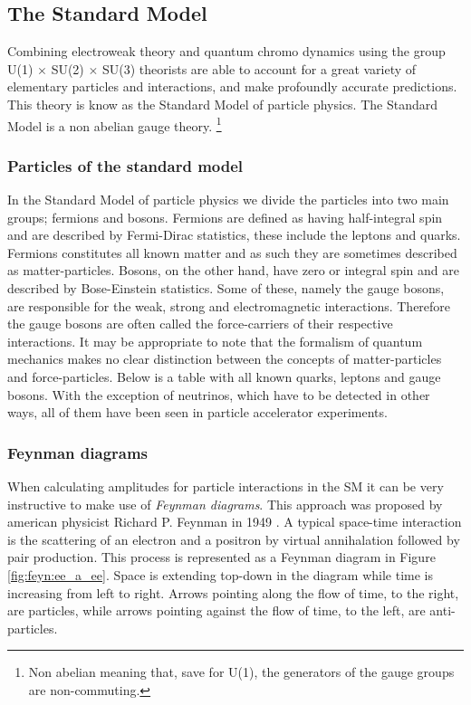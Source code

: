\subsection{The Standard Model}
Combining electroweak theory and quantum chromo dynamics using the group U(1) $\times$ SU(2) $\times$ SU(3) theorists are able to account for a great variety of elementary particles and interactions, and make profoundly accurate predictions. This theory is know as the Standard Model of particle physics. The Standard Model is a non abelian gauge theory. \footnote{Non abelian meaning that, save for U(1), the generators of the gauge groups are non-commuting.}

\subsubsection{Particles of the standard model}


In the Standard Model of particle physics we divide the particles into two main groups; fermions and bosons. Fermions are defined as having half-integral spin and are described by Fermi-Dirac statistics, these include the leptons and quarks. Fermions constitutes all known matter and as such they are sometimes described as matter-particles. Bosons, on the other hand, have zero or integral spin and are described by Bose-Einstein statistics. Some of these, namely the gauge bosons, are responsible for the weak, strong and electromagnetic interactions. Therefore the gauge bosons are often called the force-carriers of their respective interactions. It may be appropriate to note that the formalism of quantum mechanics makes no clear distinction between the concepts of matter-particles and force-particles. Below is a table with all known quarks, leptons and gauge bosons. With the exception of neutrinos, which have to be detected in other ways, all of them have been seen in particle accelerator experiments.

\subsubsection{Feynman diagrams}
When calculating amplitudes for particle interactions in the SM it can be very instructive to make use of \emph{Feynman diagrams}. This approach was proposed by american physicist Richard P. Feynman in 1949 \cite{feynman1949sta}. A typical space-time interaction is the scattering of an electron and a positron by virtual annihalation followed by pair production. This process is represented as a Feynman diagram in Figure \ref{fig:feyn:ee_a_ee}. Space is extending top-down in the diagram while time is increasing from left to right. Arrows pointing along the flow of time, to the right, are particles, while arrows pointing against the flow of time, to the left, are anti-particles.

